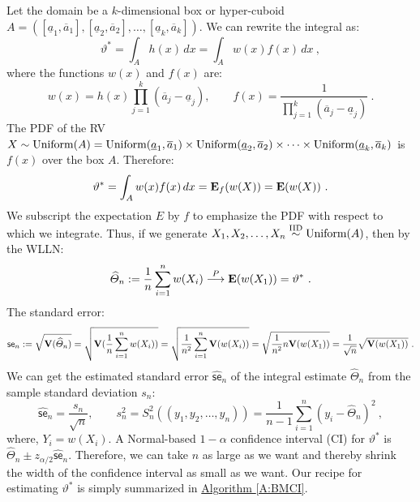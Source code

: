 Let the domain be a $k$-dimensional box or hyper-cuboid $A=([\underline{a}_1,\overline{a}_1], [\underline{a}_2,\overline{a}_2] , \ldots, [\underline{a}_k,\overline{a}_k] )$.  We can rewrite the integral as:
\begin{equation}\label{E:BMCI}
\vartheta^* = \int_A h(x)\, dx = \int_A w(x) f(x)\, dx \ ,
\end{equation}
where the functions $w(x)$ and $f(x)$ are:
\[
w(x)= h(x) \prod_{j=1}^k (\overline{a}_j - \underline{a}_j) , \qquad f(x)=\frac{1}{\prod_{j=1}^k (\overline{a}_j - \underline{a}_j) } \ .
\]
The PDF of the RV $X \sim \mbox{{\rm Uniform}}(A) = \mbox{{\rm Uniform}}(\underline{a}_1,\overline{a}_1) \times  \mbox{{\rm Uniform}}(\underline{a}_2,\overline{a}_2) \times \cdots \times  \mbox{{\rm Uniform}}(\underline{a}_k,\overline{a}_k)$ is $f(x)$ over the box $A$.  Therefore: 
\[
\vartheta^* =  \int_A w(x) f(x)\, dx = \mathbf{E}_f(w(X)) = \mathbf{E}(w(X)) \ .
\]
We subscript the expectation $E$ by $f$ to emphasize the PDF with respect to which we integrate.  Thus, if we generate $X_1,X_2,\ldots,X_n \overset{{\rm IID}}{\sim} \mbox{{\rm Uniform}}(A)$, then by the WLLN:
\[
\widehat{\varTheta}_n := \frac{1}{n} \sum_{i=1}^n w(X_i) \overset{P}{\longrightarrow} \e(w(X_1)) = \vartheta^* \ .
\]
The standard error:
\[
\mathsf{se}_n := \sqrt{\mathbf{V}(\widehat{\varTheta}_n)} = \sqrt{\mathbf{V}(\frac{1}{n} \sum_{i=1}^n w(X_i))} = \sqrt{\frac{1}{n^2} \sum_{i=1}^n \mathbf{V}( w(X_i))} = \sqrt{\frac{1}{n^2} n \mathbf{V}( w(X_1))} = \frac{1}{\sqrt{n}} \sqrt{\mathbf{V}( w(X_1))} \ .
\]
We can get the estimated standard error $\widehat{\mathsf{se}}_n$ of the integral estimate $\widehat{\varTheta}_n$ from the sample standard deviation $s_n$:
\[
\widehat{\mathsf{se}}_n = \frac{s_n}{\sqrt{n}}, \qquad 
s_n^2 = S_n^2((y_1,y_2,\ldots,y_n)) = \frac{1}{n-1} \sum_{i=1}^n \left( y_i - \widehat{\varTheta}_n \right)^2 \ , 
\]
where, $Y_i = w(X_i)$.  A Normal-based $1-\alpha$ confidence interval (CI) for $\vartheta^*$ is $\widehat{\varTheta}_n \pm z_{\alpha/2} \widehat{\mathsf{se}}_n$.  Therefore, we can take $n$ as large as we want and thereby shrink the width of the confidence interval as small as we want.  Our recipe for estimating $\vartheta^*$ is simply summarized in \hyperref[A:BMCI]{Algorithm \ref*{A:BMCI}}.  
